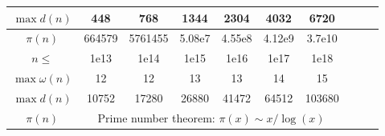 \begin{table}[H]
\begin{tabular}{|c|c|c|c|c|c|c|c|c|c|}
		\hline
		$\max{d(n)}$ & 448 & 768 & 1344 & 2304 & 4032 & 6720 \\
		\hline
		$\pi(n)$ & 664579 & 5761455 & 5.08e7 & 4.55e8 & 4.12e9 & 3.7e10 \\
		\hline
		\rowcolor{black!10} $n \leq$ & 1e13& 1e14& 1e15& 1e16& 1e17& 1e18 \\
		\hline
		$\max\omega(n)$ & 12 & 12 & 13 & 13 & 14 & 15 \\
		\hline
		$\max{d(n)}$ & 10752 & 17280 & 26880 & 41472 & 64512 & 103680\\
		\hline
		$\pi(n)$ & \multicolumn{6}{c|}{Prime number theorem: $\pi(x) \sim x / \log (x)$} \\
		\hline
		\end{tabular}

	\end{table}
